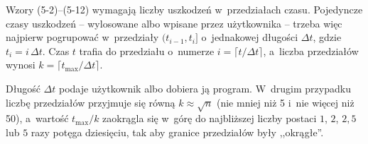 Wzory (5-2)--(5-12) wymagają liczby uszkodzeń w~przedziałach czasu. Pojedyncze
czasy uszkodzeń -- wylosowane albo wpisane przez użytkownika -- trzeba więc najpierw
pogrupować w~przedziały $(t_{i-1}, t_i]$ o~jednakowej długości $\Delta t$, gdzie
$t_i = i\,\Delta t$. Czas $t$ trafia do przedziału o~numerze
$i = \lceil t / \Delta t \rceil$, a~liczba przedziałów wynosi
$k = \lceil t_{\max} / \Delta t \rceil$.

Długość $\Delta t$ podaje użytkownik albo dobiera ją program. W~drugim przypadku
liczbę przedziałów przyjmuje się równą $k \approx \sqrt{n}$ (nie mniej niż 5 i~nie
więcej niż 50), a~wartość $t_{\max}/k$ zaokrągla się w~górę do najbliższej liczby
postaci $1$, $2$, $2{,}5$ lub $5$ razy potęga dziesięciu, tak aby granice
przedziałów były ,,okrągłe''.

